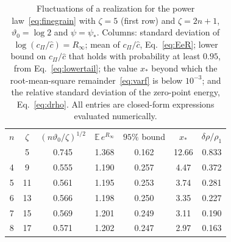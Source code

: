 \documentclass[aps,prd,10pt,twocolumn,superscriptaddress,nofootinbib,floatfix,longbibliography]{revtex4-2}
\newcommand{\bE}{\mathbb{E}}
\begin{document}
\begin{table}[t]
\caption{Fluctuations of a realization for the power law~\eqref{eq:finegrain} with $\zeta=5$ (first row) and $\zeta=2n+1$, $\vartheta_0=\log2$ and $\psi=\psi_*$. Columns: standard deviation of $\log(c_\Pi/\hat c)=R_\infty$; mean of $c_\Pi/\hat c$, Eq.~\eqref{eq:EeR}; lower bound on $c_\Pi/\hat c$ that holds with probability at least $0.95$, from Eq.~\eqref{eq:lowertail}; the value $x_*$ beyond which the root-mean-square remainder~\eqref{eq:varf} is below $10^{-3}$; and the relative standard deviation of the zero-point energy, Eq.~\eqref{eq:drho}. All entries are closed-form expressions evaluated numerically.}
\label{tab:fluct}
\begin{ruledtabular}
\begin{tabular}{ccccccc}
$n$ & $\zeta$ & $(n\vartheta_0/\zeta)^{1/2}$ & $\bE\,e^{R_\infty}$ & $95\%$ bound & $x_*$ & $\delta\rho/\rho_1$\\
\colrule
4 & 5 & 0.745 & 1.368 & 0.162 & 12.66 & 0.833\\
4 & 9 & 0.555 & 1.190 & 0.257 & 4.47 & 0.372\\
5 & 11 & 0.561 & 1.195 & 0.253 & 3.74 & 0.281\\
6 & 13 & 0.566 & 1.198 & 0.250 & 3.35 & 0.227\\
7 & 15 & 0.569 & 1.201 & 0.249 & 3.11 & 0.190\\
8 & 17 & 0.571 & 1.202 & 0.247 & 2.97 & 0.163\\
\end{tabular}
\end{ruledtabular}
\end{table}
\end{document}
